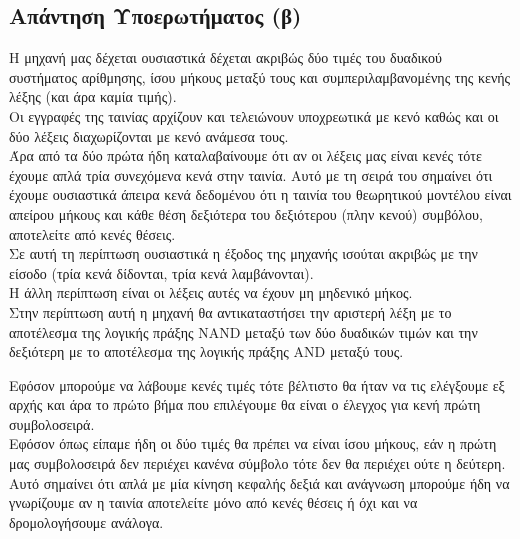 \subsection{Απάντηση Υποερωτήματος (β)}
\label{ssec:Solution_1.2}
\doublespacing

\par Η μηχανή μας δέχεται ουσιαστικά δέχεται ακριβώς δύο τιμές του δυαδικού συστήματος αρίθμησης, ίσου μήκους
μεταξύ τους και συμπεριλαμβανομένης της κενής λέξης (και άρα καμία τιμής).\\
Οι εγγραφές της ταινίας αρχίζουν και τελειώνουν υποχρεωτικά με κενό καθώς και οι δύο λέξεις διαχωρίζονται με κενό
ανάμεσα τους.\\
Άρα από τα δύο πρώτα ήδη καταλαβαίνουμε ότι αν οι λέξεις μας είναι κενές τότε έχουμε απλά τρία συνεχόμενα κενά στην
ταινία. Αυτό με τη σειρά του σημαίνει ότι έχουμε ουσιαστικά άπειρα κενά δεδομένου ότι η ταινία του θεωρητικού
μοντέλου είναι απείρου μήκους και κάθε θέση δεξιότερα του δεξιότερου (πλην κενού) συμβόλου, αποτελείτε από κενές
θέσεις.\\
Σε αυτή τη περίπτωση ουσιαστικά η έξοδος της μηχανής ισούται ακριβώς με την είσοδο (τρία κενά δίδονται, τρία κενά
λαμβάνονται).\\
Η άλλη περίπτωση είναι οι λέξεις αυτές να έχουν μη μηδενικό μήκος.\\
Στην περίπτωση αυτή η μηχανή θα αντικαταστήσει την αριστερή λέξη με το αποτέλεσμα της λογικής πράξης NAND μεταξύ
των δύο δυαδικών τιμών και την δεξιότερη με το αποτέλεσμα της λογικής πράξης AND μεταξύ τους.

\par
Εφόσον μπορούμε να λάβουμε κενές τιμές τότε βέλτιστο θα ήταν να τις ελέγξουμε εξ αρχής και άρα το πρώτο βήμα που
επιλέγουμε θα είναι ο έλεγχος για κενή πρώτη συμβολοσειρά.\\
Εφόσον όπως είπαμε ήδη οι δύο τιμές θα πρέπει να είναι ίσου μήκους, εάν η πρώτη μας συμβολοσειρά δεν περιέχει
κανένα σύμβολο τότε δεν θα περιέχει ούτε η δεύτερη.\\
Αυτό σημαίνει ότι απλά με μία κίνηση κεφαλής δεξιά και ανάγνωση μπορούμε ήδη να γνωρίζουμε αν η ταινία αποτελείτε
μόνο από κενές θέσεις ή όχι και να δρομολογήσουμε ανάλογα.

